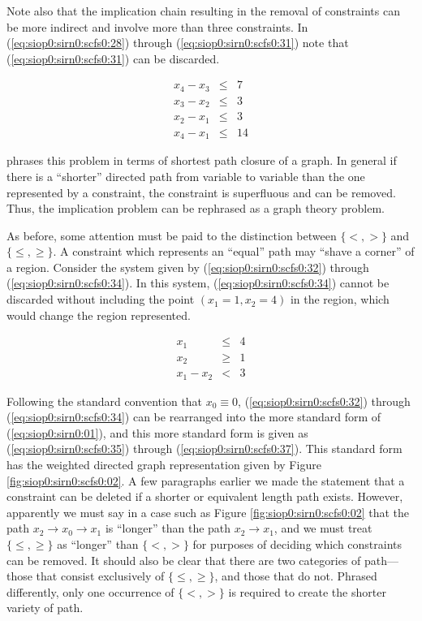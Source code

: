 Note also that the implication chain resulting in the removal of 
constraints can be more indirect and involve more than three
constraints.  In 
(\ref{eq:siop0:sirn0:scfs0:28}) through 
(\ref{eq:siop0:sirn0:scfs0:31}) note that 
(\ref{eq:siop0:sirn0:scfs0:31}) can be discarded.

\begin{eqnarray}
\label{eq:siop0:sirn0:scfs0:28} 
   x_4 - x_3 & \leq & 7     \\
\label{eq:siop0:sirn0:scfs0:29}
   x_3 - x_2 & \leq & 3     \\
\label{eq:siop0:sirn0:scfs0:30}
   x_2 - x_1 & \leq & 3     \\
\label{eq:siop0:sirn0:scfs0:31}
   x_4 - x_1 & \leq & 14 
\end{eqnarray}

\cite{bib:b:modelchecking:clark1999} phrases 
this problem in terms of shortest 
path closure of a graph.
In general if there is a ``shorter'' directed path from variable to
variable than the one represented by a constraint, the constraint
is superfluous and
can be removed.  Thus, the implication problem can be
rephrased as a graph theory problem.

As before, some attention must be paid to the distinction between
$\{<, >\}$ and $\{ \leq, \geq \}$.  A constraint 
which represents an ``equal'' path may 
``shave a corner'' of
a region.  Consider the system given by 
(\ref{eq:siop0:sirn0:scfs0:32}) through
(\ref{eq:siop0:sirn0:scfs0:34}).  In this system,
(\ref{eq:siop0:sirn0:scfs0:34}) cannot be discarded without
including the point $(x_1=1, x_2=4)$ in the region,
which would change the region represented.

\begin{eqnarray}
\label{eq:siop0:sirn0:scfs0:32} 
   x_1       & \leq & 4     \\
\label{eq:siop0:sirn0:scfs0:33}
   x_2       & \geq & 1     \\
\label{eq:siop0:sirn0:scfs0:34}
   x_1 - x_2 & <    & 3 
\end{eqnarray}

Following the standard convention that
$x_0 \equiv 0$, (\ref{eq:siop0:sirn0:scfs0:32}) through
(\ref{eq:siop0:sirn0:scfs0:34}) can be rearranged into
the more standard form of (\ref{eq:siop0:sirn0:01}), 
and this more standard
form is given as
(\ref{eq:siop0:sirn0:scfs0:35}) through 
(\ref{eq:siop0:sirn0:scfs0:37}).  This standard form has the
weighted directed graph representation given by
Figure \ref{fig:siop0:sirn0:scfs0:02}.  A few paragraphs
earlier we made the statement that a constraint can be deleted
if a shorter or equivalent length path exists.  However, apparently
we must say in a case such as Figure \ref{fig:siop0:sirn0:scfs0:02} 
that the path $x_2 \rightarrow x_0 \rightarrow x_1$ is
``longer'' than the path $x_2 \rightarrow x_1$, and we must
treat $\{ \leq, \geq \}$ as ``longer'' 
than $\{<, >\}$ for purposes of deciding which constraints can
be removed.  It should also be clear that there are two categories
of path---those that consist exclusively of $\{ \leq, \geq \}$,
and those that do not.  Phrased differently, only one occurrence of
$\{<, >\}$ is required to create the shorter variety of path.

